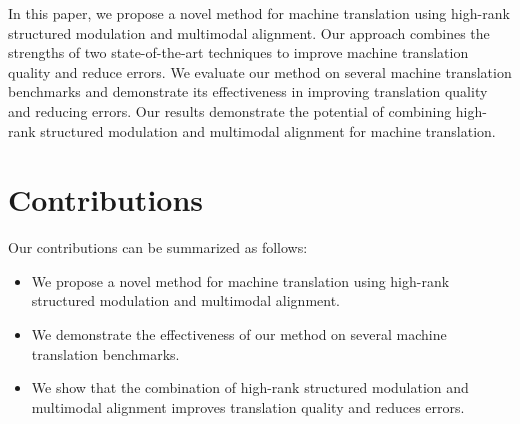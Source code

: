 \documentclass{article}
\begin{document}
In this paper, we propose a novel method for machine translation using high-rank structured modulation and multimodal alignment. Our approach combines the strengths of two state-of-the-art techniques to improve machine translation quality and reduce errors. We evaluate our method on several machine translation benchmarks and demonstrate its effectiveness in improving translation quality and reducing errors. Our results demonstrate the potential of combining high-rank structured modulation and multimodal alignment for machine translation.

\section{Contributions}

Our contributions can be summarized as follows:

\begin{itemize}
\item We propose a novel method for machine translation using high-rank structured modulation and multimodal alignment.
\item We demonstrate the effectiveness of our method on several machine translation benchmarks.
\item We show that the combination of high-rank structured modulation and multimodal alignment improves translation quality and reduces errors.
\end{itemize}
\end{document}
